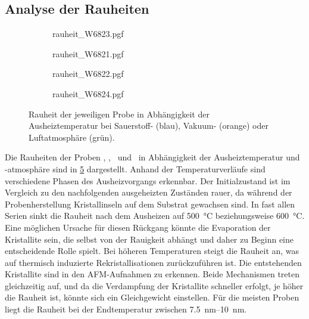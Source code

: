 \subsection{Analyse der Rauheiten}\label{subsec:Rauheit}
\begin{figure}
    \centering
    \begin{subfigure}{0.48\textwidth}
        \centering
        {rauheit_W6823.pgf}
        \caption{\samplethree}
        \label{fig: AFM, Sauerstoff}
    \end{subfigure}
    \begin{subfigure}{0.48\textwidth}
        \centering
        {rauheit_W6821.pgf}
        \caption{\sampleone}
        \label{fig: AFM, Sauerstoff}
    \end{subfigure}
    \begin{subfigure}{0.48\textwidth}
        \centering
        {rauheit_W6822.pgf}
        \caption{\sampletwo}
        \label{fig: AFM, Sauerstoff}
    \end{subfigure}
    \begin{subfigure}{0.48\textwidth}
        \centering
        {rauheit_W6824.pgf}
        \caption{\samplefour}
        \label{fig: AFM, Sauerstoff}
    \end{subfigure}
    \caption{Rauheit der jeweiligen Probe in Abhängigkeit der Ausheiztemperatur bei Sauerstoff- (blau), Vakuum-
        (orange) oder Luftatmosphäre (grün).}
    \label{fig:Rauheit}
\end{figure}
Die Rauheiten der Proben \samplethree, \sampleone, \sampletwo\ und \samplefour\ in Abhängigkeit der Ausheiztemperatur
und -atmosphäre sind in \cref{fig:Rauheit} dargestellt.
Anhand der Temperaturverläufe sind verschiedene Phasen des Aus\-heiz\-vor\-gangs erkennbar.
Der Initialzustand ist im Vergleich zu den nachfolgenden ausgeheizten Zuständen rauer,
da während der Probenherstellung Kristallinseln auf dem Substrat gewachsen sind.
In fast allen Serien sinkt die Rauheit nach dem Ausheizen auf \qty{500}{\degreeCelsius} beziehungsweise
\qty{600}{\degreeCelsius}.
Eine möglichen Ursache für diesen Rückgang könnte die Evaporation der Kristallite sein, die selbst von der
Rauigkeit abhängt \autocite{evaporation} und daher zu Beginn eine entscheidende Rolle spielt.
Bei höheren Temperaturen steigt die Rauheit an, was auf thermisch induzierte Rekristallisationen
\autocite{evaporation} zurückzuführen ist.
Die entstehenden Kristallite sind in den AFM-Aufnahmen zu erkennen.
Beide Mechanismen treten gleichzeitig auf, und da die Verdampfung der Kristallite schneller erfolgt, je höher die
Rauheit ist, könnte sich ein Gleichgewicht einstellen.
Für die meisten Proben liegt die Rauheit bei der Endtemperatur zwischen \qtyrange{7.5}{10}{\nano\meter}.
\newpage

